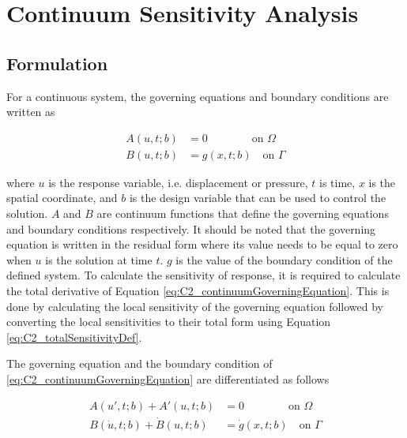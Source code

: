 \section{Continuum Sensitivity Analysis}
\subsection{Formulation}
For a continuous system, the governing equations and boundary conditions are written as

\begin{subequations}\label{eq:C2_continuumGoverningEquation}
\begin{align}
	A(u, t; b) &= 0 \qquad \qquad \text{on } \Omega \\
	B(u, t; b) &= g(x, t; b) \quad \text{on } \Gamma
\end{align}	
\end{subequations}

where $u$ is the response variable, i.e. displacement or pressure, $t$ is time, $x$ is the spatial coordinate, and $b$ is the design variable that can be used to control the solution. $A$ and $B$ are continuum functions that define the governing equations and boundary conditions respectively. It should be noted that the governing equation is written in the residual form where its value needs to be equal to zero when $u$ is the solution at time $t$. $g$ is the value of the boundary condition of the defined system. To calculate the sensitivity of response, it is required to calculate the total derivative of Equation \eqref{eq:C2_continuumGoverningEquation}. This is done by calculating the local sensitivity of the governing equation followed by converting the local sensitivities to their total form using Equation \eqref{eq:C2_totalSensitivityDef}.

The governing equation and the boundary condition of \eqref{eq:C2_continuumGoverningEquation} are differentiated as follows

\begin{subequations}\label{eq:C2_continuumSensitivityFormulation}
\begin{align}
	A(u', t; b) + A'(u, t; b) &= 0 \qquad \qquad \text{on } \Omega \\
	B(\dot{u}, t; b) + \dot{B}(u, t; b) &= \dot{g}(x, t; b) \quad \text{on } \Gamma
\end{align}	
\end{subequations}

